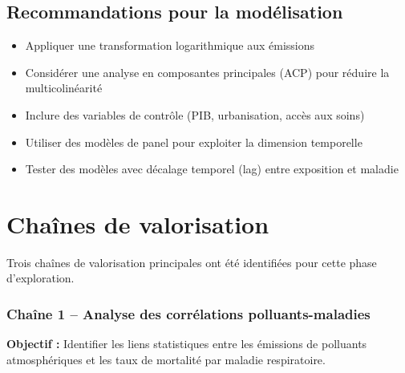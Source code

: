 \documentclass[11pt,a4paper]{article}
\begin{document}
\subsection{Recommandations pour la modélisation}

\begin{itemize}[noitemsep]
    \item Appliquer une transformation logarithmique aux émissions
    \item Considérer une analyse en composantes principales (ACP) pour réduire la multicolinéarité
    \item Inclure des variables de contrôle (PIB, urbanisation, accès aux soins)
    \item Utiliser des modèles de panel pour exploiter la dimension temporelle
    \item Tester des modèles avec décalage temporel (lag) entre exposition et maladie
\end{itemize}

\section{Chaînes de valorisation}

Trois chaînes de valorisation principales ont été identifiées pour cette phase d'exploration.


\subsubsection{Chaîne 1 -- Analyse des corrélations polluants-maladies}

\textbf{Objectif :} Identifier les liens statistiques entre les émissions de polluants atmosphériques et les taux de mortalité par maladie respiratoire.
\end{document}
